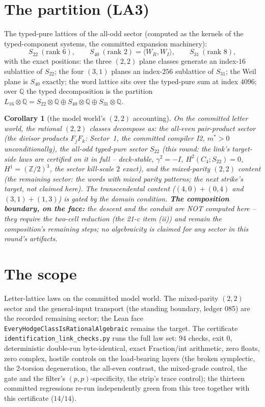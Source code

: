 \documentclass[11pt]{article}
\newtheorem{corollary}[theorem]{Corollary}
\newcommand{\Z}{\mathbb{Z}}
\newcommand{\Q}{\mathbb{Q}}
\begin{document}
\section{The partition (LA3)}

The typed-pure lattices of the all-odd sector (computed as the kernels of
the typed-component systems, the committed expansion machinery):
\[
  S_{22}\ (\text{rank }6),\qquad S_{40}\ (\text{rank }2)=\langle W_R,W_I\rangle,\qquad
  S_{31}\ (\text{rank }8),
\]
with the exact positions: the three $(2,2)$ plane classes generate an
index-$16$ sublattice of $S_{22}$; the four $(3,1)$ planes an index-$256$
sublattice of $S_{31}$; the Weil plane is $S_{40}$ exactly; the word
lattice sits over the typed-pure sum at index $4096$; over $\Q$ the
typed decomposition is the partition
$L_{16}\otimes\Q=S_{22}\otimes\Q\oplus S_{40}\otimes\Q\oplus
S_{31}\otimes\Q$.

\begin{corollary}[the model world's $(2,2)$ accounting]
On the committed letter world, the rational $(2,2)$ classes decompose as:
the all-even pair-product sector (the divisor products $F_jF_k$:
Sector~1, the committed compiler I2, $m^*>0$ unconditionally), the all-odd
typed-pure sector $S_{22}$ (this round: the link's target-side laws are
certified on it in full -- deck-stable, $\gamma^2=-I$, $H^2(C_4;S_{22})=0$,
$H^1=(\Z/2)^3$, the sector kill-scale $2$ exact), and the mixed-parity
$(2,2)$ content (the remaining sector: the words with mixed parity
patterns; the next strike's target, not claimed here). The transcendental
content ($(4,0){+}(0,4)$ and $(3,1){+}(1,3)$) is gated by the domain
condition. \textbf{The composition boundary, on the face:} the descent and
the conduit are NOT computed here -- they require the two-cell reduction
(the 21-c item (ii)) and remain the composition's remaining steps; no
algebraicity is claimed for any sector in this round's artifacts.
\end{corollary}

\section{The scope}

Letter-lattice laws on the committed model world. The mixed-parity $(2,2)$
sector and the general-input transport (the standing boundary, ledger 085)
are the recorded remaining sector; the Lean face
\texttt{EveryHodgeClassIsRationalAlgebraic} remains the target. The
certificate \texttt{identification\_link\_checks.py} runs the full law set:
$94$ checks, exit $0$, deterministic double-run byte-identical, exact
$\mathrm{Fraction}$/int arithmetic, zero floats, zero complex, hostile
controls on the load-bearing layers (the broken symplectic, the 2-torsion
degeneration, the all-even contrast, the mixed-grade control, the gate and
the filter's $(p,p)$-specificity, the strip's trace control); the thirteen
committed regressions re-run independently green from this tree together
with this certificate ($14/14$).
\end{document}
